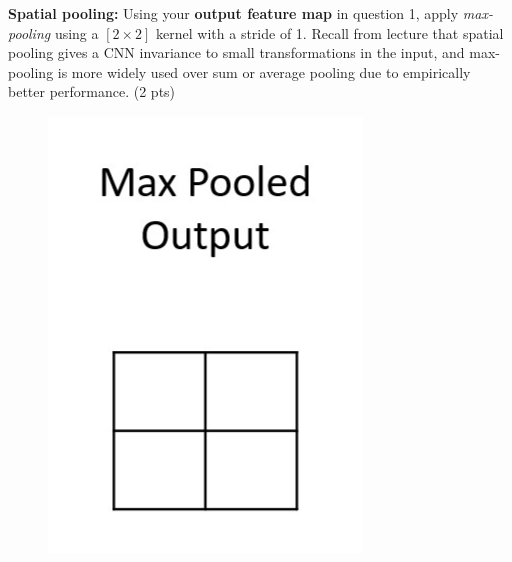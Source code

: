 \textbf{Spatial pooling:} Using your \textbf{output feature map} in question 1, apply \textit{max-pooling} using a $[2 \times 2]$ kernel with a stride of 1. Recall from lecture that spatial pooling gives a CNN invariance to small transformations in the input, and max-pooling is more widely used over sum or average pooling due to empirically better performance. (2 pts)

\begin{figure}[H]
	\centering
	\includegraphics[width=.11\linewidth]{images/max_pooled_blank.png}
\end{figure}

\begin{tcolorbox}[title=Solution]
\end{tcolorbox}

